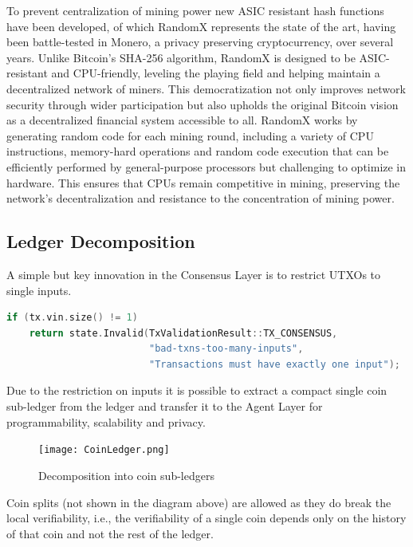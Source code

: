 \documentclass{article}
\begin{document}
To prevent centralization of mining power new ASIC resistant hash functions have been developed, of which RandomX represents the state of the art, having been battle-tested in Monero, a privacy preserving cryptocurrency, over several years. Unlike Bitcoin's SHA-256 algorithm, RandomX is designed to be ASIC-resistant and CPU-friendly, leveling the playing field and helping maintain a decentralized network of miners. This democratization not only improves network security through wider participation but also upholds the original Bitcoin vision as a decentralized financial system accessible to all. RandomX works by generating random code for each mining round, including a variety of CPU instructions, memory-hard operations and random code execution that can be efficiently performed by general-purpose processors but challenging to optimize in hardware. This ensures that CPUs remain competitive in mining, preserving the network's decentralization and resistance to the concentration of mining power.




\subsection{Ledger Decomposition}


A simple but key innovation in the Consensus Layer is to restrict UTXOs to single inputs.

\begin{minipage}{\linewidth}
\begin{lstlisting}[language=C++]
if (tx.vin.size() != 1)
    return state.Invalid(TxValidationResult::TX_CONSENSUS,
                         "bad-txns-too-many-inputs",
                         "Transactions must have exactly one input");
\end{lstlisting}
\end{minipage}

Due to the restriction on inputs it is possible to extract a compact single coin sub-ledger from the ledger and transfer it to the Agent Layer for programmability, scalability and privacy.

\begin{figure}[H]
    \centering
    \texttt{[image: CoinLedger.png]}
    \caption{Decomposition into coin sub-ledgers}
    \label{fig:coinledger}
\end{figure}


Coin splits (not shown in the diagram above) are allowed as they do break the local verifiability, i.e., the verifiability of a single coin depends only on the history of that coin and not the rest of the ledger.
\end{document}
